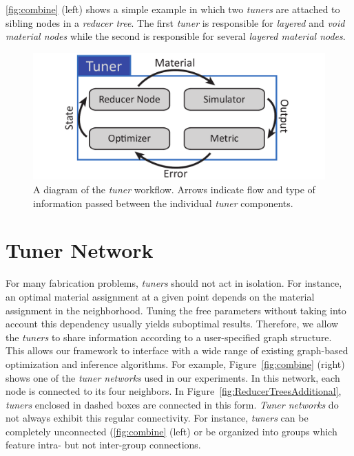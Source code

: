 \autoref{fig:combine} (left) shows a simple example in which two \emph{tuners} are attached to sibling nodes in a \emph{reducer tree}. The first \emph{tuner} is responsible for \emph{layered} and \emph{void material nodes }while the second is responsible for several \emph{layered material nodes}.  

\begin{figure}[h]
\centering
\includegraphics[width=0.7\linewidth]{figure/tuner2.pdf}
\caption{A diagram of the \emph{tuner} workflow. Arrows indicate flow and type of information passed between the individual \emph{tuner} components.}
\label{fig:tuner0}
\end{figure}

\section{Tuner Network}
\label{sec:TunerNetwork}
For many fabrication problems, \emph{tuners} should not act in isolation. For instance, an optimal material assignment at a given point depends on the material assignment in the neighborhood. Tuning the free parameters without taking into account this dependency usually yields suboptimal results. Therefore, we allow the \emph{tuners} to share information according to a user-specified graph structure. This allows our framework to interface with a wide range of existing graph-based optimization and inference algorithms. For example, Figure~\ref{fig:combine} (right) shows one of the \emph{tuner networks} used in our experiments.
In this network, each node is connected to its four neighbors. In Figure~\ref{fig:ReducerTreesAdditional}, \emph{tuners} enclosed in dashed boxes are connected in this form. \emph{Tuner networks} do not always exhibit this regular connectivity. For instance, \emph{tuners} can be completely unconnected (\autoref{fig:combine} (left) or be organized into groups which feature intra- but not inter-group connections.

